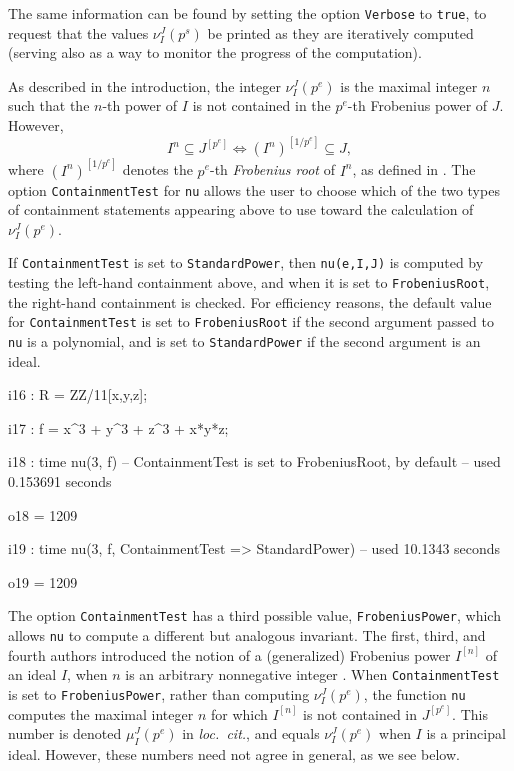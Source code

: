 \documentclass{amsart}
\begin{document}
\noindent The same information can be found by setting the option \texttt{Verbose} to \texttt{true}, to request that the values $\nu_I^J(p^s)$ be printed as they are iteratively computed (serving also as a way to monitor the progress of the computation).

As described in the introduction, the integer $\nu_I^J(p^e)$ is the maximal integer $n$ such that the $n$-th power of $I$ is not contained in the $p^e$-th Frobenius power of $J$.  However,
\begin{equation*}
  I^n \subseteq J^{[p^e]} \Longleftrightarrow (I^n)^{[1/p^e]} \subseteq J,
\end{equation*}
where $(I^n)^{[1/p^e]}$ denotes the $p^e$-th \emph{Frobenius root} of $I^n$, as defined in \cite{BlickleMustataSmithDiscretenessAndRationalityOfFThresholds}.
The option \texttt{ContainmentTest} for \texttt{nu} allows the user to choose which of the two types of containment statements appearing above to use toward the calculation of $\nu_I^J(p^e)$.

If \texttt{ContainmentTest} is set to \texttt{StandardPower}, then \texttt{nu(e,I,J)} is computed by testing the left-hand containment above, and when it is set to \texttt{FrobeniusRoot}, the right-hand containment is checked.
For efficiency reasons, the default value for \texttt{ContainmentTest} is set to  \texttt{FrobeniusRoot} if the second argument passed to \texttt{nu} is a polynomial, and is set to \texttt{StandardPower} if the second argument is an ideal.

\smallskip
{\small
{}
\begin{MyVerbatim}
i16 : R = ZZ/11[x,y,z];

i17 : f = x^3 + y^3 + z^3 + x*y*z;

i18 : time nu(3, f) -- ContainmentTest is set to FrobeniusRoot, by default
     -- used 0.153691 seconds

o18 = 1209

i19 : time nu(3, f, ContainmentTest => StandardPower)
     -- used 10.1343 seconds

o19 = 1209
\end{MyVerbatim}
}

The option \texttt{ContainmentTest} has a third possible value, \texttt{FrobeniusPower}, which allows \texttt{nu} to compute a different but analogous invariant.
The first, third, and fourth authors introduced the notion of a (generalized) Frobenius power $I^{[n]}$ of an ideal $I$, when $n$ is an arbitrary nonnegative integer \cite{hernandez+etal.frobenius_powers}.
When \texttt{ContainmentTest} is set to \texttt{FrobeniusPower}, rather than  computing $\nu_I^J(p^e)$, the function \texttt{nu} computes the maximal integer $n$ for which $I^{[n]}$ is not contained in $J^{[p^e]}$.  This number is denoted $\mu_I^J(p^e)$ in \emph{loc.~cit.}, and equals $\nu_I^J(p^e)$ when $I$ is a principal ideal.
However, these numbers need not agree in general, as we see below.
\end{document}
